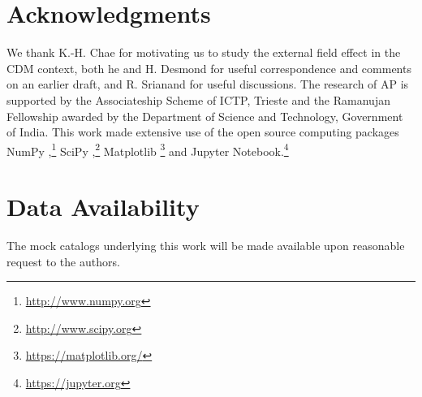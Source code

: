 \documentclass[usenatbib]{mnras}
\begin{document}
\section*{Acknowledgments}
We thank K.-H. Chae for motivating us to study the external field effect in the CDM context, both he and H. Desmond for useful correspondence and comments on an earlier draft, and R. Srianand for useful discussions.
The research of AP is supported by the Associateship Scheme of ICTP, Trieste and the Ramanujan Fellowship awarded by the Department of Science and Technology, Government of India.
This work made extensive use of the open source computing packages NumPy \citep{vanderwalt-numpy},\footnote{\url{http://www.numpy.org}} SciPy \citep{scipy},\footnote{\url{http://www.scipy.org}} Matplotlib \citep{hunter07_matplotlib}\footnote{\url{https://matplotlib.org/}} and Jupyter Notebook.\footnote{\url{https://jupyter.org}}

\section*{Data Availability}
The mock catalogs underlying this work will be made available upon reasonable request to the authors.


 
\label{lastpage}
\end{document}
